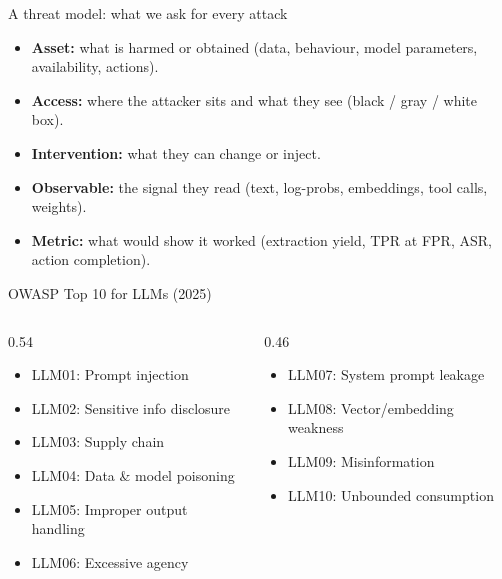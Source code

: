 \documentclass[12pt,aspectratio=169,handout]{beamer}
\begin{document}
\begin{frame}{A threat model: what we ask for every attack}

\begin{itemize}\small
	\setlength{\itemsep}{0.15em}
	\item \textbf{Asset:} what is harmed or obtained (data, behaviour, model parameters, availability, actions).
	\item \textbf{Access:} where the attacker sits and what they see (black / gray / white box).
	\item \textbf{Intervention:} what they can change or inject.
	\item \textbf{Observable:} the signal they read (text, log-probs, embeddings, tool calls, weights).
	\item \textbf{Metric:} what would show it worked (extraction yield, TPR at FPR, ASR, action completion).
\end{itemize}

\end{frame}


\begin{frame}{OWASP Top 10 for LLMs (2025)}

\begin{columns}[T]
\begin{column}{0.54\textwidth}
\footnotesize
\begin{itemize}
	\item LLM01: Prompt injection
	\item LLM02: Sensitive info disclosure
	\item LLM03: Supply chain
	\item LLM04: Data \& model poisoning
	\item LLM05: Improper output handling
	\item LLM06: Excessive agency
\end{itemize}
\end{column}
\begin{column}{0.46\textwidth}
\footnotesize
\begin{itemize}
	\item LLM07: System prompt leakage
	\item LLM08: Vector/embedding weakness
	\item LLM09: Misinformation
	\item LLM10: Unbounded consumption
\end{itemize}
\end{column}
\end{columns}

\end{frame}
\end{document}

